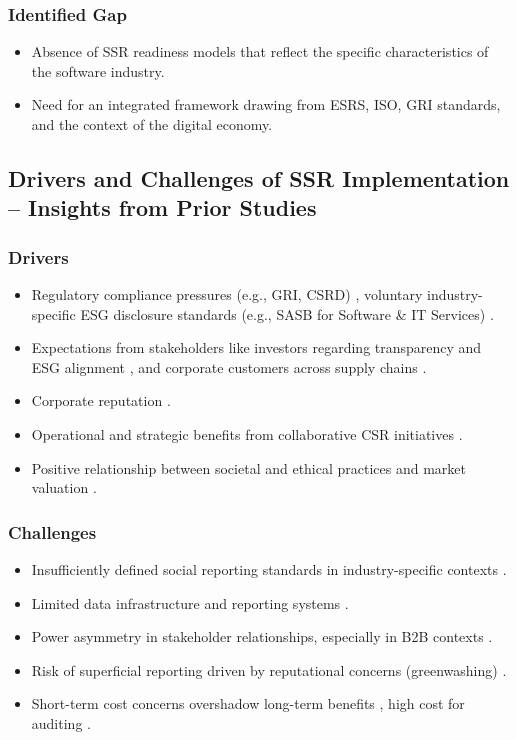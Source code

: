 \subsubsection{Identified Gap}
\begin{itemize}
    \item Absence of SSR readiness models that reflect the specific characteristics of the software industry.
    \item Need for an integrated framework drawing from ESRS, ISO, GRI standards, and the context of the digital economy.
\end{itemize}

\subsection{Drivers and Challenges of SSR Implementation – Insights from Prior Studies}
\subsubsection{Drivers}
\begin{itemize}
    \item Regulatory compliance pressures (e.g., GRI, CSRD) \parencite{Reitmaier2025}, voluntary industry-specific ESG disclosure standards (e.g., SASB for Software \& IT Services) \parencite{Bochkay2025}.
    \item Expectations from stakeholders like investors regarding transparency and ESG alignment \parencite{Bonnefon2022}, and corporate customers across supply chains \parencite{Dai2019}.
    \item Corporate reputation \parencite{Reitmaier2025}.
    \item Operational and strategic benefits from collaborative CSR initiatives \parencite{Dai2019}.
    \item Positive relationship between societal and ethical practices and market valuation \parencite{Chouaibi2021}.
\end{itemize}

\subsubsection{Challenges}
\begin{itemize}
    \item Insufficiently defined social reporting standards in industry-specific contexts \parencite{Bochkay2025}.
    \item Limited data infrastructure and reporting systems \parencite{Troshani2024, ElBaz2022, Jona2023, Belal2016}.
    \item Power asymmetry in stakeholder relationships, especially in B2B contexts \parencite{Dai2019}.
    \item Risk of superficial reporting driven by reputational concerns (greenwashing) \parencite{Reitmaier2025, Belal2016}.
    \item Short-term cost concerns overshadow long-term benefits \parencite{Dai2019}, high cost for auditing \parencite{Najjar2023}.
\end{itemize}

